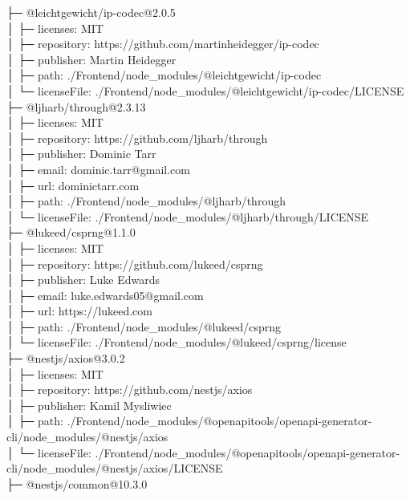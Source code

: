 \documentclass[
    paper=a4,
    twoside=false,
    parskip=half,
    listof=entryprefix,
    listof=totoc,
    index=totoc,
    bibliography=totoc,
    headsepline,
]{scrbook}
\begin{document}
    ├─ @leichtgewicht/ip-codec@2.0.5\\
    │  ├─ licenses: MIT\\
    │  ├─ repository: https://github.com/martinheidegger/ip-codec\\
    │  ├─ publisher: Martin Heidegger\\
    │  ├─ path: ./Frontend/node\_modules/@leichtgewicht/ip-codec\\
    │  └─ licenseFile: ./Frontend/node\_modules/@leichtgewicht/ip-codec/LICENSE\\
    ├─ @ljharb/through@2.3.13\\
    │  ├─ licenses: MIT\\
    │  ├─ repository: https://github.com/ljharb/through\\
    │  ├─ publisher: Dominic Tarr\\
    │  ├─ email: dominic.tarr@gmail.com\\
    │  ├─ url: dominictarr.com\\
    │  ├─ path: ./Frontend/node\_modules/@ljharb/through\\
    │  └─ licenseFile: ./Frontend/node\_modules/@ljharb/through/LICENSE\\
    ├─ @lukeed/csprng@1.1.0\\
    │  ├─ licenses: MIT\\
    │  ├─ repository: https://github.com/lukeed/csprng\\
    │  ├─ publisher: Luke Edwards\\
    │  ├─ email: luke.edwards05@gmail.com\\
    │  ├─ url: https://lukeed.com\\
    │  ├─ path: ./Frontend/node\_modules/@lukeed/csprng\\
    │  └─ licenseFile: ./Frontend/node\_modules/@lukeed/csprng/license\\
    ├─ @nestjs/axios@3.0.2\\
    │  ├─ licenses: MIT\\
    │  ├─ repository: https://github.com/nestjs/axios\\
    │  ├─ publisher: Kamil Mysliwiec\\
    │  ├─ path: ./Frontend/node\_modules/@openapitools/openapi-generator-cli/node\_modules/@nestjs/axios\\
    │  └─ licenseFile: ./Frontend/node\_modules/@openapitools/openapi-generator-cli/node\_modules/@nestjs/axios/LICENSE\\
    ├─ @nestjs/common@10.3.0\\
\end{document}
